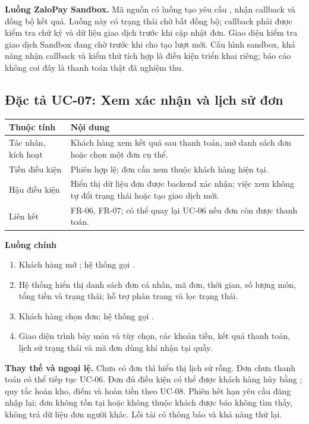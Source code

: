 \textbf{Luồng ZaloPay Sandbox.} Mã nguồn có luồng tạo yêu cầu
, nhận callback và đồng bộ kết quả.
Luồng này có trạng thái chờ bất đồng bộ; callback phải được kiểm tra
chữ ký và dữ liệu giao dịch trước khi cập nhật đơn. Giao diện kiểm tra
giao dịch Sandbox đang chờ trước khi cho tạo lượt mới. Cấu hình sandbox,
khả năng nhận callback và kiểm thử tích hợp là điều kiện triển khai riêng;
báo cáo không coi đây là thanh toán thật đã nghiệm thu.

\subsection{Đặc tả UC-07: Xem xác nhận và lịch sử đơn}
\label{uc:07}
\label{uc07}

\begin{longtable}{|p{3.1cm}|p{11.5cm}|}
\hline \textbf{Thuộc tính} & \textbf{Nội dung} \\ \hline
Tác nhân, kích hoạt & Khách hàng xem kết quả sau thanh toán, mở danh sách
đơn hoặc chọn một đơn cụ thể. \\ \hline
Tiền điều kiện & Phiên hợp lệ; đơn cần xem thuộc khách hàng hiện tại. \\ \hline
Hậu điều kiện & Hiển thị dữ liệu đơn được backend xác nhận; việc xem
không tự đổi trạng thái hoặc tạo giao dịch mới. \\ \hline
Liên kết & FR-06, FR-07; có thể quay lại UC-06 nếu đơn còn được thanh toán. \\ \hline
\end{longtable}

\textbf{Luồng chính}
\begin{enumerate}[nosep]
  \item Khách hàng mở ; hệ thống gọi .
  \item Hệ thống hiển thị danh sách đơn cá nhân, mã đơn, thời gian, số
  lượng món, tổng tiền và trạng thái; hỗ trợ phân trang và lọc trạng thái.
  \item Khách hàng chọn đơn; hệ thống gọi .
  \item Giao diện trình bày món và tùy chọn, các khoản tiền, kết quả
  thanh toán, lịch sử trạng thái và mã đơn dùng khi nhận tại quầy.
\end{enumerate}

\textbf{Thay thế và ngoại lệ.} Chưa có đơn thì hiển thị lịch sử rỗng.
Đơn chưa thanh toán có thể tiếp tục UC-06. Đơn đủ điều kiện có thể được
khách hàng hủy bằng ; quy tắc hoàn
kho, điểm và hoàn tiền theo UC-08. Phiên hết hạn yêu cầu đăng nhập lại;
đơn không tồn tại hoặc không thuộc khách được báo không tìm thấy, không
trả dữ liệu đơn người khác. Lỗi tải có thông báo và khả năng thử lại.

